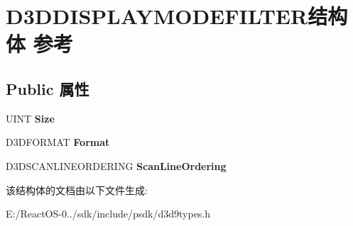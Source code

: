\hypertarget{struct_d3_d_d_i_s_p_l_a_y_m_o_d_e_f_i_l_t_e_r}{}\section{D3\+D\+D\+I\+S\+P\+L\+A\+Y\+M\+O\+D\+E\+F\+I\+L\+T\+E\+R结构体 参考}
\label{struct_d3_d_d_i_s_p_l_a_y_m_o_d_e_f_i_l_t_e_r}
\subsection*{Public 属性}
\begin{DoxyCompactItemize}
\item 
\mbox{\label{struct_d3_d_d_i_s_p_l_a_y_m_o_d_e_f_i_l_t_e_r_a999ec5375c87b5e3ae93a89a267283f8}} 
U\+I\+NT {\bfseries Size}
\item 
\mbox{\label{struct_d3_d_d_i_s_p_l_a_y_m_o_d_e_f_i_l_t_e_r_a43c9c3aca2525a3f17e63d169d4d7c5d}} 
D3\+D\+F\+O\+R\+M\+AT {\bfseries Format}
\item 
\mbox{\label{struct_d3_d_d_i_s_p_l_a_y_m_o_d_e_f_i_l_t_e_r_a2270f969a211d347d588e5a3f5feb1b3}} 
D3\+D\+S\+C\+A\+N\+L\+I\+N\+E\+O\+R\+D\+E\+R\+I\+NG {\bfseries Scan\+Line\+Ordering}
\end{DoxyCompactItemize}


该结构体的文档由以下文件生成\+:\begin{DoxyCompactItemize}
\item 
E\+:/\+React\+O\+S-\/0../sdk/include/psdk/d3d9types.\+h\end{DoxyCompactItemize}
